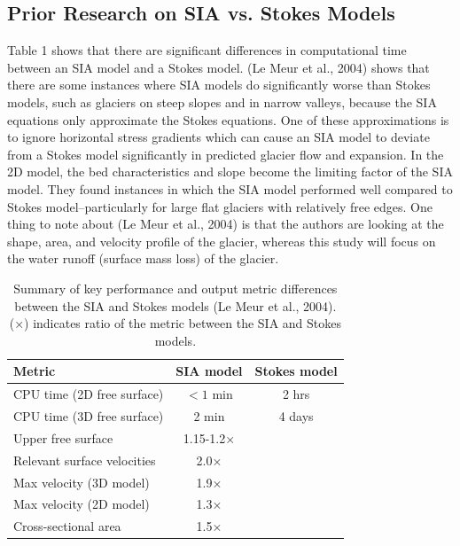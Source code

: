 \documentclass{article}
\begin{document}
\subsection{Prior Research on SIA vs. Stokes Models}
Table 1 shows that there are significant differences in computational time between an SIA model and a Stokes model. 
(Le Meur et al., 2004) shows that there are some instances where SIA models do significantly worse than 
Stokes models, such as glaciers on steep slopes and in narrow valleys, because the SIA equations only approximate the Stokes 
equations. One of these approximations is to ignore horizontal stress gradients which can cause an SIA model to deviate from a Stokes model 
significantly in predicted glacier flow and expansion. In the 2D model, the bed characteristics and slope become the limiting factor of the SIA model.
They found instances in which the SIA model performed well 
compared to Stokes model--particularly for large flat glaciers with relatively free edges. One thing to note about (Le Meur et al., 2004) is 
that the authors are looking at the shape, area, and velocity profile of the glacier, whereas this study will focus on the water runoff 
(surface mass loss) of the glacier.
\begin{table}[ht]
    \centering
    \begin{tabular}{lcc}
      \hline
      \textbf{Metric} & \textbf{SIA model} & \textbf{Stokes model} \\
      \hline
      CPU time (2D free surface)                & $<1$ min        & 2 hrs    \\
      CPU time (3D free surface)                & 2 min  & 4 days    \\
      Upper free surface        & 1.15-1.2×    &    \\
      Relevant surface velocities    & 2.0×   &      \\
      Max velocity (3D model)               & 1.9×         &       \\
      Max velocity (2D model)               & 1.3×         &        \\
      Cross-sectional area        & 1.5×         &       \\
      \hline
    \end{tabular}
    \caption{Summary of key performance and output metric differences between the SIA and Stokes models (Le Meur et al., 2004). (×) indicates ratio of the metric between the SIA and Stokes models.}
    \label{tab:sia_vs_stokes}
  \end{table}
\FloatBarrier  
  
\end{document}
